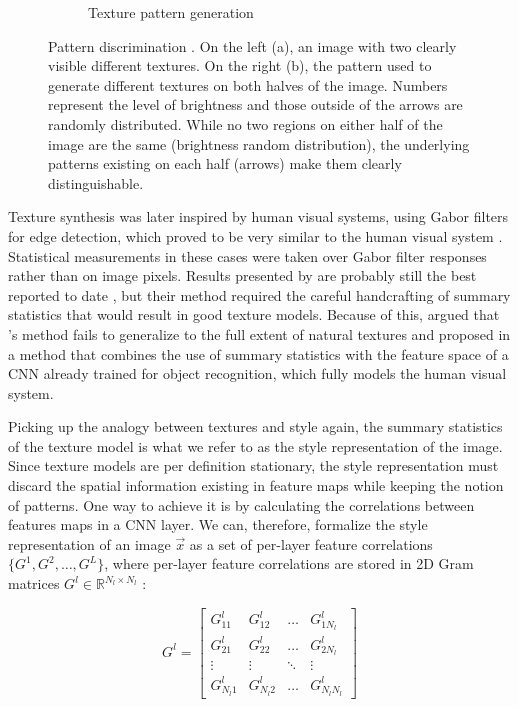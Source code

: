 \begin{figure}[t]
\begin{subfigure}[b]{0.5\textwidth}
    \caption{Texture pattern generation}
    \label{sub:system:method:style-reconstruction:texture-2}
  \end{subfigure}
  \caption{Pattern discrimination \cite{Julesz1962}.
    On the left (a), an image with two clearly visible different textures.
    On the right (b), the pattern used to generate different textures on both halves of the image.
    Numbers represent the level of brightness and those outside of the arrows are randomly distributed.
    While no two regions on either half of the image are the same (brightness random distribution), the underlying patterns existing on each half (arrows) make them clearly distinguishable.}
  \label{sub:system:method:style-reconstruction:texture}
\end{figure}

Texture synthesis was later inspired by human visual systems, using Gabor filters for edge detection, which proved to be very similar to the human visual system \cite{Heeger1995,Portilla2000}.
Statistical measurements in these cases were taken over Gabor filter responses rather than on image pixels.
Results presented by \citet{Portilla2000} are probably still the best reported to date \cite{Gatys2015A}, but their method required the careful handcrafting of summary statistics that would result in good texture models.
Because of this, \citeauthor{Gatys2015A} argued that \citeauthor{Portilla2000}'s method fails to generalize to the full extent of natural textures and proposed in \cite{Gatys2015A} a method that combines the use of summary statistics with the feature space of a CNN already trained for object recognition, which fully models the human visual system.

Picking up the analogy between textures and style again, the summary statistics of the texture model is what we refer to as the style representation of the image.
Since texture models are per definition stationary, the style representation must discard the spatial information existing in feature maps while keeping the notion of patterns.
One way to achieve it is by calculating the correlations between features maps in a CNN layer.
We can, therefore, formalize the style representation of an image $\vec{x}$ as a set of per-layer feature correlations $\{G^1, G^2, \dots, G^L\}$, where per-layer feature correlations are stored in 2D Gram matrices $G^l \in \mathbb{R}^{{N_l}\times{N_l}}$ \cite[Theorem~7.2.10]{Horn2012}:

\begin{equation}
  G^l =
  \begin{bmatrix}
    G^l_{11}   & G^l_{12}   & \dots  & G^l_{1N_l} \\
    G^l_{21}   & G^l_{22}   & \dots  & G^l_{2N_l} \\
    \vdots     & \vdots     & \ddots & \vdots   \\
    G^l_{N_l1} & G^l_{N_l2} & \dots  & G^l_{N_lN_l}
  \end{bmatrix}
\end{equation}


